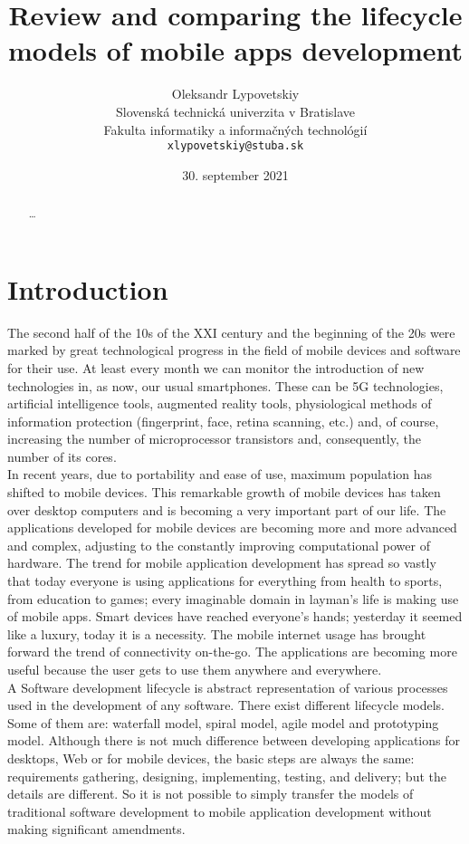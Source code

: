 \documentclass[10pt,slovak,a4paper]{article}
\title{Review and comparing the lifecycle models of mobile apps development} %
\author{Oleksandr Lypovetskiy\\[2pt]
	{\small Slovenská technická univerzita v Bratislave}\\
	{\small Fakulta informatiky a informačných technológií}\\
	{\small \texttt{xlypovetskiy@stuba.sk}}
	}
\date{\small 30. september 2021} %
\begin{document}
\maketitle

\begin{abstract}
\ldots
\end{abstract}


\section{Introduction}
The second half of the 10s of the XXI century and the beginning of the 20s were marked by great technological progress in the field of mobile devices and software for their use. At least every month we can monitor the introduction of new technologies in, as now, our usual smartphones. These can be 5G technologies, artificial intelligence tools, augmented reality tools, physiological methods of information protection (fingerprint, face, retina scanning, etc.) and, of course, increasing the number of microprocessor transistors and, consequently, the number of its cores.
\\
In recent years, due to portability and ease of use, maximum population has shifted to mobile devices. This remarkable growth of mobile devices has taken over desktop computers and is becoming a very important part of our life. The applications developed for mobile devices are becoming more and more advanced and complex,  adjusting to the constantly improving computational power of hardware.
The trend for mobile application development has spread so vastly that today everyone is using applications for everything from health to sports, from education to games; every imaginable domain in layman’s life is making use of mobile apps. Smart devices have reached everyone’s hands; yesterday it seemed like a luxury, today it is a necessity. The mobile internet usage has brought forward the trend of connectivity on-the-go. The applications are becoming more useful because the user gets to use them anywhere and everywhere.
\\
A Software development lifecycle is abstract representation of various processes used in the development of any software. There exist different lifecycle models. Some of them are: waterfall model, spiral model, agile model and prototyping model. Although there is not much difference between developing applications for desktops, Web or for mobile devices, the basic steps are always the same: requirements gathering, designing, implementing, testing, and delivery; but the details are different. So it is not possible to simply transfer the models of traditional software development to mobile application development without making significant amendments.
\end{document}
